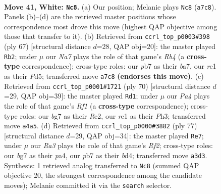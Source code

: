 \documentclass[11pt]{article}
\begin{document}
\clearpage

\begin{figure}[p]\centering
\begin{subfigure}{0.46\textwidth}\centering
\resizebox{\linewidth}{!}{%
\newchessgame
\chessboard[
  setfen={8/Np4bk/6p1/5p1p/P7/R5P1/1r3PKP/4r3 w - - 0 41},
  showmover=false,
  pgfstyle=straightmove, color=movearrow, markmove={a7-c8}
]}
\caption{}
\end{subfigure}\hfill
\begin{subfigure}{0.46\textwidth}\centering
\resizebox{\linewidth}{!}{%
\newchessgame
\chessboard[
  setfen={8/B4Rpk/7p/1r1pp3/2n3P1/7P/4PPK1/8 b - - 1 34},
  showmover=false,
  pgfstyle=straightmove, color=movearrow, markmove={b5-b2}
]}
\caption{}
\end{subfigure}
\\[4pt]
\begin{subfigure}{0.46\textwidth}\centering
\resizebox{\linewidth}{!}{%
\newchessgame
\chessboard[
  setfen={2r4k/5rp1/1p1p3p/p7/P7/1P5P/4RPP1/5RK1 w - - 2 36},
  showmover=false,
  pgfstyle=straightmove, color=movearrow, markmove={f1-d1}
]}
\caption{}
\end{subfigure}\hfill
\begin{subfigure}{0.46\textwidth}\centering
\resizebox{\linewidth}{!}{%
\newchessgame
\chessboard[
  setfen={8/1p3r2/7p/1R4pk/P1nB1p2/2P4P/6P1/5K2 b - - 4 39},
  showmover=false,
  pgfstyle=straightmove, color=movearrow, markmove={f7-e7}
]}
\caption{}
\end{subfigure}
\caption{\textbf{Move 41, White: \texttt{Nc8}.} (a) Our position; Melanie plays \texttt{Nc8} (\texttt{a7c8}). Panels (b)--(d) are the retrieved master positions whose correspondence most drove this move (highest QAP objective among those that transfer to it). (b) Retrieved from \texttt{ccrl\_top\_p0003\#398} (ply 67) [structural distance $d$=28, QAP obj=20]: the master played \texttt{Rb2}; under $\mu$ our \emph{Na7} plays the role of that game's \emph{Rb4} (a \textbf{cross-type} correspondence); cross-type roles: our \emph{p}b7 as their \emph{b}a7, our \emph{r}e1 as their \emph{P}d5; transferred move \texttt{a7c8} \textbf{(endorses this move)}. (c) Retrieved from \texttt{ccrl\_top\_p0001\#1721} (ply 70) [structural distance $d$=29, QAP obj=39]: the master played \texttt{Rd1}; under $\mu$ our \emph{Pa4} plays the role of that game's \emph{Rf1} (a \textbf{cross-type} correspondence); cross-type roles: our \emph{b}g7 as their \emph{R}e2, our \emph{r}e1 as their \emph{P}h3; transferred move \texttt{a4a5}. (d) Retrieved from \texttt{ccrl\_top\_p0000\#3882} (ply 77) [structural distance $d$=29, QAP obj=34]: the master played \texttt{Re7}; under $\mu$ our \emph{Ra3} plays the role of that game's \emph{Rf2}; cross-type roles: our \emph{b}g7 as their \emph{p}a4, our \emph{p}b7 as their \emph{b}d4; transferred move \texttt{a3d3}. Synthesis: 1 retrieved analog transferred to \texttt{Nc8} (summed QAP objective 20, the strongest correspondence among the candidate moves); Melanie committed it via the \texttt{search} selector.}
\label{fig:thought-m80}
\end{figure}
\end{document}
